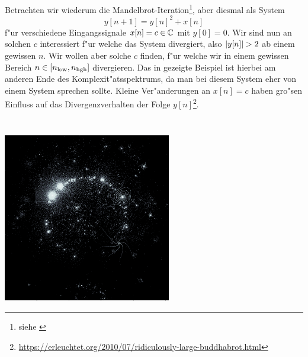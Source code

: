 Betrachten wir wiederum die Mandelbrot-Iteration\footnote{siehe \href{%
https://github.com/SebastianSemper/lecturenotes/blob/main/dsv/code/mandelbrot.py
}{}}, aber diesmal als System
\[
    y[n+1] = y[n]^2 + x[n]
\]
f"ur verschiedene Eingangssignale $x[n] = c \in \mathbb{C}$ mit $y[0] = 0$.
Wir sind nun an solchen $c$ interessiert f"ur welche das System divergiert, also ${\left| y[n] \right|} > 2$ ab einem gewissen $n$.
Wir wollen aber solche $c$ finden, f"ur welche wir in einem gewissen Bereich $n \in [n_{\rm low}, n_{\rm hgh}]$ divergieren.
Das in  gezeigte Beispiel ist hierbei am anderen Ende des Komplexit"atsspektrums, da man bei diesem System eher von einem  System sprechen sollte. 
Kleine Ver"anderungen an $x[n] = c$ haben gro"sen Einfluss auf das Divergenzverhalten der Folge $y[n]$\footnote{\url{https://erleuchtet.org/2010/07/ridiculously-large-buddhabrot.html}}.
\begin{listing}
    \noindent
    \begin{minipage}{0.49\textwidth}
        \strut\vspace*{-\baselineskip}\newline
        \inputminted[firstline=5,lastline=26]{python3}{code/buddhabrot.py}
    \end{minipage}%
    \begin{minipage}{0.49\textwidth}
        \strut\vspace*{-\baselineskip}\newline
        \inputminted[firstline=29,lastline=53]{python3}{code/buddhabrot.py}
    \end{minipage}

    \begin{center}
        \includegraphics[width=0.55\textwidth]{code/buddhabrot.png}
    \end{center}
    \label{py:buddhabrot}
\end{listing}

